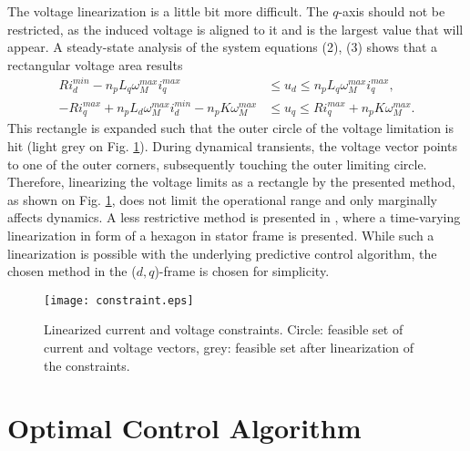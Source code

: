 \documentclass[a4paper,11pt,fleqn]{article}
\begin{document}
The voltage linearization is a little bit more difficult. The $q$-axis should not be restricted, as the induced voltage is aligned to it and is the largest value that will appear. A steady-state analysis of the system equations (2), (3) shows that a rectangular voltage area results
\begin{align}
 R i_{d}^{min} -n_p L_q \omega_{M}^{max} i_{q}^{max}                &\le   u_d    \le   n_p L_q \omega_{M}^{max} i_{q}^{max}  ,\\
-R i_{q}^{max}  +n_pL_d\omega_{M}^{max} i_{d}^{min}  -n_p K \omega_{M}^{max}  &\le   u_q    \le   R i_{q}^{max} +n_p K \omega_{M}^{max} .
\end{align}
This rectangle is expanded such that the outer circle of the voltage limitation is hit (light grey on Fig. \ref{fig:constraints}). During dynamical transients, the voltage vector points to one of the outer corners, subsequently touching the outer limiting circle. Therefore, linearizing the voltage limits as a rectangle by the presented method, as shown on Fig. \ref{fig:constraints}, does not limit the operational range and only marginally affects dynamics. A less restrictive method is presented in \cite{onlineMPC}, where a time-varying linearization in form of a hexagon in stator frame is presented. While such a linearization is possible with the underlying predictive control algorithm, the chosen method in the ($d,q$)-frame is chosen for simplicity.


\begin{figure}[!ht]
  \centering
  \texttt{[image: constraint.eps]}
  \caption{Linearized current and voltage constraints. Circle: feasible set of current and voltage vectors, grey: feasible set after linearization of the constraints.\label{fig:constraints}}
\end{figure}











\section*{Optimal Control Algorithm}
\end{document}
